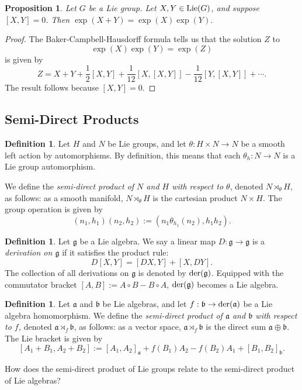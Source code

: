 \documentclass{amsart}[]
\newcommand{\alert}[1]{\color{red}#1\color{black}}
\newcommand{\lie}{\text{\normalfont Lie}}
\newcommand{\der}{\text{\normalfont der}}
\theoremstyle{plain}
\newtheorem{proposition}[theorem]{Proposition}
\theoremstyle{definition}
\newtheorem{definition}[theorem]{Definition}
\theoremstyle{remark}
\begin{document}
	\begin{proposition}
		Let $G$ be a Lie group. Let $X,Y \in \lie(G)$, and suppose $[X,Y] = 0$. Then $\exp(X+Y) = \exp(X) \exp(Y).$
	\end{proposition}
	\begin{proof}
		The \alert{Baker-Campbell-Hausdorff formula } tells us that the solution $Z$ to $$\exp(X)\exp(Y) = \exp(Z)$$ is given by 
		$$Z = X + Y + \frac12 [X,Y] + \frac1{12}[X,[X,Y]] - \frac1{12}[Y,[X,Y]] + \cdots.$$
		The result follows because $[X,Y] = 0$.
	\end{proof}
	
	\subsection{Semi-Direct Products}
	\begin{definition}
		Let $H$ and $N$ be Lie groups, and let $\theta:H \times N \rightarrow N$ be a smooth left action by automorphisms. By definition, this means that each $\theta_h:N \rightarrow N$ is a Lie group automorphism.
		
		We define the \emph{semi-direct product of $N$ and $H$ with respect to  $\theta$}, denoted $N \rtimes_{\theta} H$, as follows: as a smooth manifold, $N \rtimes_{\theta} H$ is the cartesian product $N \times H$. The group operation is given by 
		$$(n_1,h_1)(n_2,h_2) := (n_1 \theta_{h_1}(n_2), h_1h_2).$$
	\end{definition}

	\begin{definition}
		Let $\mathfrak g$ be a Lie algebra. We say a linear map $D:\mathfrak g \rightarrow \mathfrak g$ is a \emph{derivation on $\mathfrak g$} if it satisfies the product rule:
		$$D[X,Y] = [DX,Y] + [X,DY].$$
		The collection of all derivations on $\mathfrak g$ is denoted by $\der(\mathfrak g)$. Equipped with the commutator bracket $[A,B] := A \circ B - B \circ A$, $\der(\mathfrak g)$ becomes a Lie algebra.
	\end{definition}

	\begin{definition}
		Let $\mathfrak a$ and $\mathfrak b$ be Lie algebras, and let $f: \mathfrak b \rightarrow \der(\mathfrak a)$ be a Lie algebra homomorphism. We define the \emph{semi-direct product of $\mathfrak a$ and $\mathfrak b$ with respect to $f$,} denoted $\mathfrak a \rtimes_f \mathfrak b$, as follows: as a vector space, $\mathfrak a \rtimes_f \mathfrak b$ is the direct sum $\mathfrak a \oplus \mathfrak b$. The Lie bracket is given by 
		$$[A_1 + B_1 ,A_2 + B_2] := [A_1,A_2]_{\mathfrak a} + f(B_1)A_2 - f(B_2) A_1 + [B_1,B_2]_{\mathfrak b}.$$
	\end{definition}
	\alert{How does the semi-direct product of Lie groups relate to the semi-direct product of Lie algebras?}
	
\end{document}
